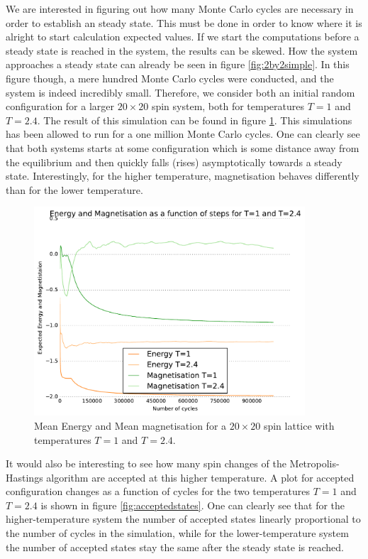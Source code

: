 \documentclass[10pt,a4paper]{amsart}
\begin{document}
We are interested in figuring out how many Monte Carlo cycles are necessary in order to establish an steady state. This must be done in order to know where it is alright to start calculation expected values. If we start the computations before a steady state is reached in the system, the results can be skewed.  How the system approaches a steady state can already be seen in figure \ref{fig:2by2simple}. In this figure though, a mere hundred Monte Carlo cycles were conducted, and the system is indeed incredibly small. Therefore, we consider both an initial random configuration for a larger $20 \times 20$ spin system, both for temperatures $T=1$ and $T=2.4$. The result of this simulation can be found in figure \ref{fig:temp1and2.4}. This simulations has been allowed to run for a one million Monte Carlo cycles. One can clearly see that both systems starts at some configuration which is some distance away from the equilibrium and then quickly falls (rises) asymptotically towards a steady state. Interestingly, for the higher temperature, magnetisation behaves differently than for the lower temperature. 

\begin{figure}
	\centering
	\includegraphics[width=0.9\textwidth]{../figures/20EandMT1and24.pdf}
	\caption{Mean Energy and Mean magnetisation for a $20 \times 20$ spin lattice with temperatures $T=1$ and $T=2.4$. \label{fig:temp1and2.4}}
\end{figure}

It would also be interesting to see how many spin changes of the Metropolis-Hastings algorithm are accepted at this higher temperature. A plot for accepted configuration changes as a function of cycles for the two temperatures $T=1$ and $T=2.4$ is shown in figure \ref{fig:acceptedstates}. One can clearly see that for the higher-temperature system the number of accepted states linearly proportional to the number of cycles in the simulation, while for the lower-temperature system the number of accepted states stay the same after the steady state is reached.  
\end{document}
